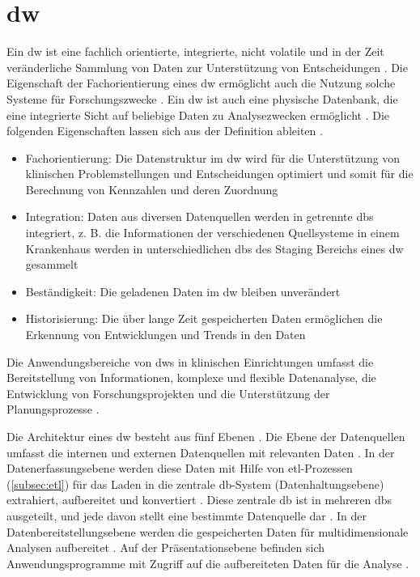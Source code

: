 \section{\acl{dw}} \label{sec:dw}

Ein \acf{dw} ist \glqq eine fachlich orientierte, integrierte, nicht volatile und in der Zeit veränderliche Sammlung von Daten zur Unterstützung von Entscheidungen\grqq{} \cite{dworiginal}. Die Eigenschaft der Fachorientierung eines \ac{dw} ermöglicht auch die Nutzung solche Systeme für Forschungszwecke \cite{dwhcliniinv}. Ein \ac{dw} ist auch \glqq eine physische Datenbank, die eine integrierte Sicht auf beliebige Daten zu Analysezwecken ermöglicht\grqq{} \cite{dwgoeken}. Die folgenden Eigenschaften lassen sich aus der Definition ableiten \cite{planungdatawarehouse}.

\begin{itemize}
	\item Fachorientierung: Die Datenstruktur im \ac{dw} wird für die Unterstützung von klinischen Problemstellungen und Entscheidungen optimiert und somit für die Berechnung von Kennzahlen und deren Zuordnung
	\item Integration: Daten aus diversen Datenquellen werden in getrennte \acp{db} integriert, z. B. die Informationen der verschiedenen Quellsysteme in einem Krankenhaus werden in unterschiedlichen \acp{db} des Staging Bereichs eines \ac{dw} gesammelt
	\item Beständigkeit: Die geladenen Daten im \ac{dw} bleiben unverändert
	\item Historisierung: Die über lange Zeit gespeicherten Daten ermöglichen die Erkennung von Entwicklungen und Trends in den Daten
\end{itemize}

Die Anwendungsbereiche von \acp{dw} in klinischen Einrichtungen umfasst die Bereitstellung von Informationen, komplexe und flexible Datenanalyse, die Entwicklung von Forschungsprojekten und die Unterstützung der Planungsprozesse \cite{planungdatawarehouse}.

Die Architektur eines \ac{dw} besteht aus fünf Ebenen \cite{dwbauer}. Die Ebene der Datenquellen umfasst die internen und externen Datenquellen mit relevanten Daten \cite{dwgoeken}. In der Datenerfassungsebene werden diese Daten mit Hilfe von \ac{etl}-Prozessen (\ref{subsec:etl}) für das Laden in die zentrale \ac{db}-System (Datenhaltungsebene) extrahiert, aufbereitet und konvertiert \cite{dworiginal}. Diese zentrale \ac{db} ist in mehreren \acp{db} ausgeteilt, und jede davon stellt eine bestimmte Datenquelle dar \cite{dwgoeken}. In der Datenbereitstellungsebene werden die gespeicherten Daten für multidimensionale Analysen aufbereitet \cite{dwbauer}. Auf der Präsentationsebene befinden sich Anwendungsprogramme mit Zugriff auf die aufbereiteten Daten für die Analyse \cite{dwtool}.

